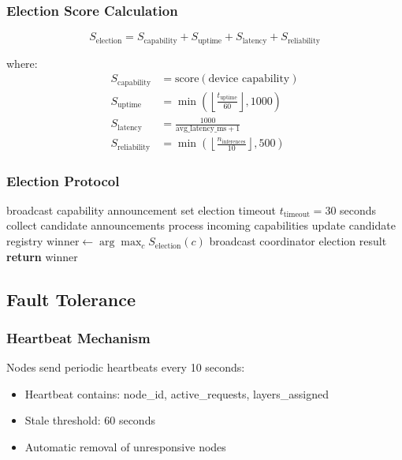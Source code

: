 \documentclass[12pt,a4paper]{article}
\begin{document}
\subsubsection{Election Score Calculation}

\begin{equation}
S_{\text{election}} = S_{\text{capability}} + S_{\text{uptime}} + S_{\text{latency}} + S_{\text{reliability}}
\end{equation}

where:
\begin{align}
S_{\text{capability}} &= \text{score}(\text{device capability}) \\
S_{\text{uptime}} &= \min\left(\left\lfloor \frac{t_{\text{uptime}}}{60} \right\rfloor, 1000\right) \\
S_{\text{latency}} &= \frac{1000}{\text{avg\_latency\_ms} + 1} \\
S_{\text{reliability}} &= \min\left(\left\lfloor \frac{n_{\text{inferences}}}{10} \right\rfloor, 500\right)
\end{align}

\subsubsection{Election Protocol}

\begin{algorithm}
\caption{Coordinator Election Protocol}
\begin{algorithmic}[1]
    \State broadcast capability announcement
    \State set election timeout $t_{\text{timeout}} = 30$ seconds
    \State collect candidate announcements
        \State process incoming capabilities
        \State update candidate registry
    \EndWhile
    \State $\text{winner} \gets \arg\max_c S_{\text{election}}(c)$
    \State broadcast coordinator election result
    \State \textbf{return} winner
\EndProcedure
\end{algorithmic}
\end{algorithm}

\subsection{Fault Tolerance}

\subsubsection{Heartbeat Mechanism}
Nodes send periodic heartbeats every 10 seconds:
\begin{itemize}
    \item Heartbeat contains: node\_id, active\_requests, layers\_assigned
    \item Stale threshold: 60 seconds
    \item Automatic removal of unresponsive nodes
\end{itemize}
\end{document}
